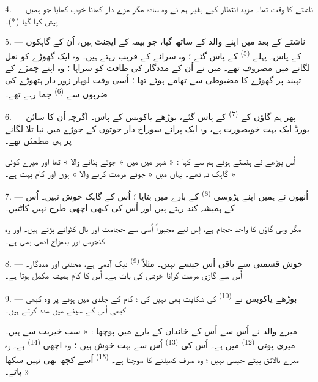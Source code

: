 4. --- ناشتے کا وقت تھا۔ مزید انتظار کیے بغیر ہم نے وہ سادہ مگر مزے
دار کھانا خوب کھایا جو ہمیں پیش کیا گیا (*)۔

\VUsaut{3.0mm}

5. --- ناشتے کے بعد میں اپنے والد کے ساتھ گیا، جو بیمہ کے ایجنٹ ہیں،
اُن کے گاہکوں کے پاس۔ پہلے  \textsuperscript{(5)} کے
پاس گئے ؛ وہ سرائے کے قریب رہتے ہیں۔ وہ ایک گھوڑے کو نعل لگانے میں
مصروف تھے۔ میں نے اُن کے مددگار کی طاقت کو سراہا ؛ وہ اپنے چمڑے کے
تہبند پر گھوڑے کا  مضبوطی سے تھامے ہوئے تھا ؛ اُسی وقت
لوہار زور دار ہتھوڑے کی ضربوں سے  \textsuperscript{(6)}
جما رہے تھے۔

6. --- پھر ہم گاؤں کے  \textsuperscript{(7)} کے پاس
گئے، بوڑھے یاکوبس کے پاس۔ اگرچہ اُن کا سائن بورڈ ایک بہت خوبصورت
 ہے، وہ ایک پرانے سوراخ دار جوتوں کے جوڑے میں نیا تلا
لگانے پر ہی مطمئن تھے۔

اُس بوڑھے نے ہنستے ہوئے ہم سے کہا : « شہر میں میں « جوتے بنانے والا »
تھا اور میرے کوئی گاہک نہ تھے۔ یہاں میں « جوتے مرمت کرنے والا » ہوں
اور کام بہت ہے۔ »

7. --- اُنھوں نے ہمیں اپنے پڑوسی  \textsuperscript{(8)}
کے بارے میں بتایا ؛ اُس کے گاہک خوش نہیں۔ اُس کے 
ہمیشہ کند رہتے ہیں اور اُس کی  کبھی اچھی طرح نہیں
کاٹتیں۔

مگر وہی گاؤں کا واحد حجام ہے، اِس لیے مجبوراً اُسی سے حجامت اور بال
کٹوانے پڑتے ہیں۔ اور وہ کنجوس اور بدمزاج آدمی بھی ہے۔

8. --- خوش قسمتی سے باقی  اُس جیسے نہیں۔ مثلاً
 \textsuperscript{(9)} نیک آدمی ہے، محنتی اور
مددگار۔ اُس سے گاڑی مرمت کرانا خوشی کی بات ہے۔ اُس کا کام ہمیشہ
مکمل ہوتا ہے۔

9. --- بوڑھے یاکوبس نے  \textsuperscript{(10)} کی
شکایت بھی نہیں کی ؛ کام کے جلدی میں ہونے پر وہ کبھی کبھی اُس کے
 سینے میں مدد کرتے ہیں۔

میرے والد نے اُس سے اُس کے خاندان کے بارے میں پوچھا : « سب خیریت سے
ہیں۔ میری پوتی  \textsuperscript{(12)} میں ہے۔ اُس کی
 \textsuperscript{(13)} اُس سے بہت خوش ہیں ؛ وہ اچھی
 \textsuperscript{(14)} ہے۔ وہ میرے نالائق بیٹے جیسی
نہیں ؛ وہ صرف کھیلنے کا سوچتا ہے۔ 
\textsuperscript{(15)} اُسے کچھ بھی نہیں سکھا پاتے۔ »

